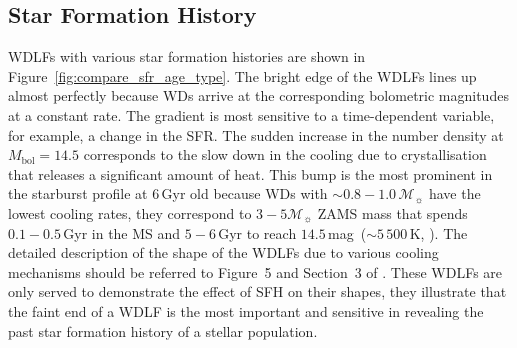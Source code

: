 \documentclass[fleqn,usenatbib]{rasti}
\newcommand{\msun}{\mathcal{M}_{\sun}}
\begin{document}
\subsection{Star Formation History}
WDLFs with various star formation histories are shown in
Figure~\ref{fig:compare_sfr_age_type}. The bright edge of the WDLFs lines up
almost perfectly because WDs arrive at the corresponding bolometric magnitudes
at a constant rate. The gradient is most sensitive to a time-dependent
variable, for example, a change in the SFR. The sudden increase in the number
density at $M_\mathrm{bol}=14.5$ corresponds to the slow down in the cooling
due to crystallisation that releases a significant amount of heat. This bump
is the most prominent in the starburst profile at $6$\,Gyr old because WDs
with $\sim0.8-1.0\,\msun$ have the lowest cooling rates, they correspond
to $3-5\msun$ ZAMS mass that spends $0.1-0.5$\,Gyr in the MS and $5-6$\,Gyr
to reach $14.5$\,mag~($\sim 5\,500$\,K, \citealp{2019ApJ...876...67B}). The
detailed description of the shape of the WDLFs due to various cooling
mechanisms should be referred to Figure~5 and Section~3
of \citealp{2001PASP..113..409F}. These WDLFs are only served to demonstrate
the effect of SFH on their shapes, they illustrate that the faint end
of a WDLF is the most important and sensitive in revealing the past
star formation history of a stellar population.
\end{document}
